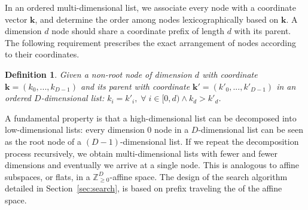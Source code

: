 \documentclass[10pt,journal,letter,compsoc]{IEEEtran}
\newtheorem{definition}{Definition}
\newtheorem{theorem}{Theorem}
\begin{document}
In an ordered multi-dimensional list, we associate every node with a coordinate vector $\mathbf{k}$, and determine the order among nodes lexicographically based on $\mathbf{k}$.
A dimension $d$ node should share a coordinate prefix of length $d$ with its parent.
The following requirement prescribes the exact arrangement of nodes according to their coordinates.

\vspace{-0.05in}
\theoremstyle{definition}
\begin{definition}
\label{def:mdlistsort}
    Given a non-root node of dimension $d$ with coordinate $\mathbf{k}=(k_0,...,k_{D-1})$ and its parent with coordinate $\mathbf{k'}=(k'_0,...,k'_{D-1})$ in an ordered $D$-dimensional list: $k_i = k'_i, \;\forall \;i \in [0, d) \land k_d > k'_d$.
\end{definition}
\vspace{-0.05in}

A fundamental property is that a high-dimensional list can be decomposed into low-dimensional lists: every dimension 0 node in a $D$-dimensional list can be seen as the root node of a $(D-1)$-dimensional list.
If we repeat the decomposition process recursively, we obtain multi-dimensional lists with fewer and fewer dimensions and eventually we arrive at a single node.
This is analogous to affine subspaces, or flats, in a $\mathbb{Z}_{\ge 0}^D$-affine space.
The design of the search algorithm detailed in Section~\ref{sec:search}, is based on prefix traveling the of the affine space.


\end{document}

